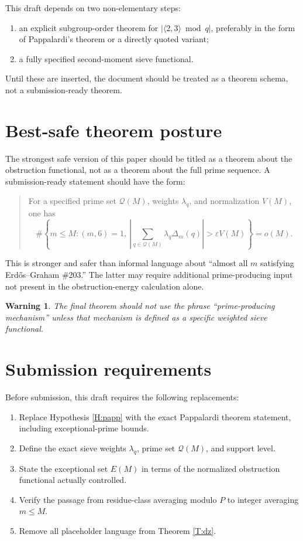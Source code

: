 \documentclass[11pt]{article}
\newtheorem{warning}{Warning}
\newcommand{\1}{\mathbf 1}
\begin{document}
This draft depends on two non-elementary steps:
\begin{enumerate}[leftmargin=1.5em]
\item an explicit subgroup-order theorem for \(|\langle2,3\rangle\bmod q|\), preferably in the form of Pappalardi's theorem or a directly quoted variant;
\item a fully specified second-moment sieve functional.
\end{enumerate}
Until these are inserted, the document should be treated as a theorem schema, not a submission-ready theorem.

\section{Best-safe theorem posture}

The strongest safe version of this paper should be titled as a theorem about the obstruction functional, not as a theorem about the full prime sequence.  A submission-ready statement should have the form:

\begin{quote}
For a specified prime set \(\mathcal Q(M)\), weights \(\lambda_q\), and normalization \(V(M)\), one has
\[
\#\left\{m\le M:(m,6)=1,\ 
\left|\sum_{q\in\mathcal Q(M)}\lambda_q\Delta_m(q)\right|>\varepsilon V(M)
\right\}
=o(M).
\]
\end{quote}

This is stronger and safer than informal language about ``almost all \(m\) satisfying Erd\H{o}s--Graham \#203.''  The latter may require additional prime-producing input not present in the obstruction-energy calculation alone.

\begin{warning}
The final theorem should not use the phrase ``prime-producing mechanism'' unless that mechanism is defined as a specific weighted sieve functional.
\end{warning}


\section{Submission requirements}

Before submission, this draft requires the following replacements:
\begin{enumerate}[leftmargin=1.5em]
\item Replace Hypothesis \ref{H:papp} with the exact Pappalardi theorem statement, including exceptional-prime bounds.
\item Define the exact sieve weights \(\lambda_q\), prime set \(\mathcal Q(M)\), and support level.
\item State the exceptional set \(E(M)\) in terms of the normalized obstruction functional actually controlled.
\item Verify the passage from residue-class averaging modulo \(P\) to integer averaging \(m\le M\).
\item Remove all placeholder language from Theorem \ref{T:dz}.
\end{enumerate}
\end{document}
